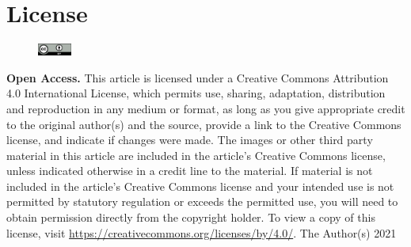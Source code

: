 \documentclass[twocolumn, reflection, authordate, serif, seplic]{jote-article}
\begin{document}
    \section*{License}
        \begin{figure}%
        \vspace{-12pt}
        \includegraphics[width=0.1\textwidth]{media/by}%
        \end{figure}
        \textbf{\textsf{Open Access.}} This article is licensed under a Creative Commons Attribution 4.0 International License, which permits use, sharing, adaptation, distribution and reproduction in any medium or format, as long as you give appropriate credit to the original author(s) and the source, provide a link to the Creative Commons license, and indicate if changes were made. The images or other third party material in this article are included in the article’s Creative Commons license, unless indicated otherwise in a credit line to the material. If material is not included in the article’s Creative Commons license and your intended use is not permitted by statutory regulation or exceeds the permitted use, you will need to obtain permission directly from the copyright holder. To view a copy of this license, visit \href{https://creativecommons.org/licenses/by/4.0/}{https://creativecommons.org/licenses/by/4.0/}.
        \newline\newline
        \textcopyright \text{ }The Author(s) 2021
\end{document}
